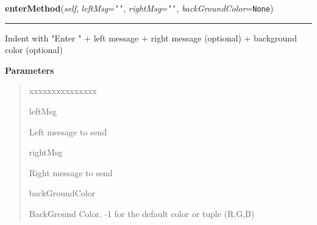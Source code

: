 \hspace{.8\funcindent}\begin{boxedminipage}{\funcwidth}

    \raggedright \textbf{enterMethod}(\textit{self}, \textit{leftMsg}={\tt \texttt{'}\texttt{}\texttt{'}}, \textit{rightMsg}={\tt \texttt{'}\texttt{}\texttt{'}}, \textit{backGroundColor}={\tt None})

    \vspace{-1.5ex}

    \rule{\textwidth}{0.5\fboxrule}
\setlength{\parskip}{2ex}
    Indent with "Enter " + left message + right message (optional) + 
    background color (optional)

\setlength{\parskip}{1ex}
      \textbf{Parameters}
      \vspace{-1ex}

      \begin{quote}
        \begin{Ventry}{xxxxxxxxxxxxxxx}

          \item[leftMsg]

          Left message to send

          \item[rightMsg]

          Right message to send

          \item[backGroundColor]

          BackGround Color. -1 for the default color or tuple (R,G,B)

        \end{Ventry}

      \end{quote}

    \end{boxedminipage}

    \label{tracetool:TraceToSend:exitMethod}

    \vspace{0.5ex}

